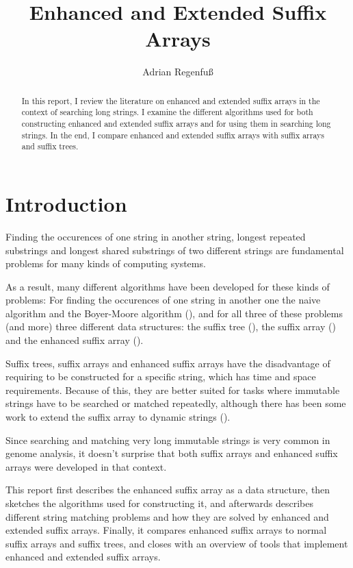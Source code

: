 \documentclass[a4paper,10pt]{article}
\title{Enhanced and Extended Suffix Arrays}
\author{Adrian Regenfuß}
\begin{document}
\maketitle

\begin{abstract}
In this report, I review the literature on enhanced and extended suffix arrays
in the context of searching long strings. I examine the different algorithms
used for both constructing enhanced and extended suffix arrays and for using
them in searching long strings.
In the end, I compare enhanced and extended suffix arrays with suffix arrays
and suffix trees.
\end{abstract}

\section*{Introduction}

Finding the occurences of one string in another string, longest repeated
substrings and longest shared substrings of two different strings are
fundamental problems for many kinds of computing systems.

As a result, many different algorithms have been developed for these kinds
of problems: For finding the occurences of one string in another one the
naive algorithm and the Boyer-Moore algorithm (\citealt{boyer1977fast}),
and for all three of these problems (and more) three different data
structures: the suffix tree (\citealt{weiner1973linear}), the suffix
array (\citealt{manber1993suffix}) and the enhanced suffix array
(\citealt{abouelhoda2002enhanced}).

Suffix trees, suffix arrays and enhanced suffix arrays have the
disadvantage of requiring to be constructed for a specific string,
which has time and space requirements.  Because of this, they are better
suited for tasks where immutable strings have to be searched or matched
repeatedly, although there has been some work to extend the suffix array
to dynamic strings (\citealt{salson2010dynamic}).

Since searching and matching very long immutable strings is very common
in genome analysis, it doesn't surprise that both suffix arrays and
enhanced suffix arrays were developed in that context.

This report first describes the enhanced suffix array as a data structure,
then sketches the algorithms used for constructing it, and afterwards
describes different string matching problems and how they are solved
by enhanced and extended suffix arrays. Finally, it compares enhanced
suffix arrays to normal suffix arrays and suffix trees, and closes with
an overview of tools that implement enhanced and extended suffix arrays.
\end{document}
